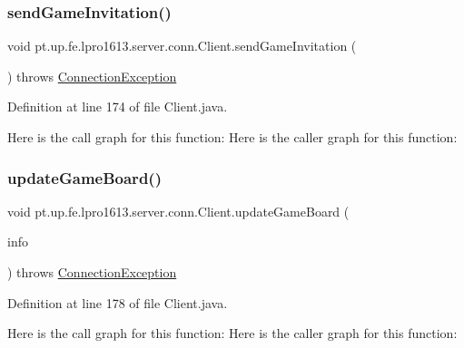 \subsubsection{\texorpdfstring{send\+Game\+Invitation()}{sendGameInvitation()}}
{\footnotesize\ttfamily void pt.\+up.\+fe.\+lpro1613.\+server.\+conn.\+Client.\+send\+Game\+Invitation (\begin{DoxyParamCaption}{ }\end{DoxyParamCaption}) throws \hyperlink{classpt_1_1up_1_1fe_1_1lpro1613_1_1sharedlib_1_1exceptions_1_1_connection_exception}{Connection\+Exception}}



Definition at line 174 of file Client.\+java.

Here is the call graph for this function\+:
Here is the caller graph for this function\+:
\hypertarget{classpt_1_1up_1_1fe_1_1lpro1613_1_1server_1_1conn_1_1_client_a68fc46855fd613c9ca06c32da08c2f5a}{}\label{classpt_1_1up_1_1fe_1_1lpro1613_1_1server_1_1conn_1_1_client_a68fc46855fd613c9ca06c32da08c2f5a} 
\subsubsection{\texorpdfstring{update\+Game\+Board()}{updateGameBoard()}}
{\footnotesize\ttfamily void pt.\+up.\+fe.\+lpro1613.\+server.\+conn.\+Client.\+update\+Game\+Board (\begin{DoxyParamCaption}\item[{\hyperlink{classpt_1_1up_1_1fe_1_1lpro1613_1_1sharedlib_1_1tuples_1_1_board_u_i_info}{Board\+U\+I\+Info}}]{info }\end{DoxyParamCaption}) throws \hyperlink{classpt_1_1up_1_1fe_1_1lpro1613_1_1sharedlib_1_1exceptions_1_1_connection_exception}{Connection\+Exception}}



Definition at line 178 of file Client.\+java.

Here is the call graph for this function\+:
Here is the caller graph for this function\+:
\hypertarget{classpt_1_1up_1_1fe_1_1lpro1613_1_1server_1_1conn_1_1_client_ad3cc8b10b942f6260a0e7db7f5a0a538}{}\label{classpt_1_1up_1_1fe_1_1lpro1613_1_1server_1_1conn_1_1_client_ad3cc8b10b942f6260a0e7db7f5a0a538} 

